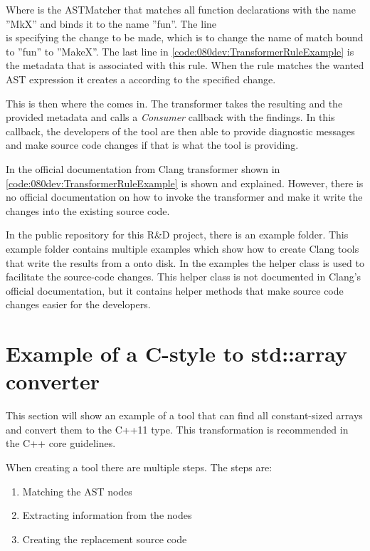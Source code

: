 Where  is the ASTMatcher that matches all function declarations with the name ''MkX'' and binds it to the name ''fun''. The line \\ is specifying the change to be made, which is to change the name of match bound to ''fun'' to ''MakeX''. The last line in \cref{code:080dev:TransformerRuleExample} is the metadata that is associated with this rule. When the rule matches the wanted AST expression it creates a  according to the specified change. 

This is then where the  comes in. The transformer takes the resulting  and the provided metadata and calls a \textit{Consumer} callback with the findings. In this callback, the developers of the tool are then able to provide diagnostic messages and make source code changes if that is what the tool is providing.\cite{ClangTransformerTutorial}

In the official documentation from Clang transformer shown in \cref{code:080dev:TransformerRuleExample} is shown and explained. However, there is no official documentation on how to invoke the transformer and make it write the changes into the existing source code. 

In the public repository for this R\&D project, there is an example folder. This example folder contains multiple examples which show how to create Clang tools that write the results from a  onto disk.\cite{kristensenMortenhaahrRD2023} In the examples the  helper class is used to facilitate the source-code changes. This helper class is not documented in Clang's official documentation, but it contains helper methods that make source code changes easier for the developers. 


\section{Example of a C-style to std::array converter}

This section will show an example of a tool that can find all constant-sized arrays and convert them to the C++11  type. This transformation is recommended in the C++ core guidelines.\cite{CoreGuidelines}

When creating a tool there are multiple steps. The steps are:
\begin{enumerate}
    \item Matching the AST nodes
    \item Extracting information from the nodes
    \item Creating the replacement source code
\end{enumerate}

